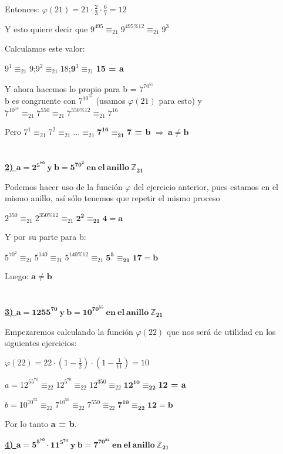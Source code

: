 \documentclass[11pt, a4paper, titlepage]{article}
\providecommand{\ent}{\mathbb{Z}}
\begin{document}
Entonces: $\varphi(21) = 21\cdot\frac{2}{3}\cdot\frac{6}{7} = 12$

Y esto quiere decir que $9^{495} \equiv_{21} 9^{495\%12}\equiv_{21}9^3 $

Calculamos este valor:

$9^1\equiv_{21}9$\quad;\quad$9^2\equiv_{21}18$\quad;\quad$\mathbf9^3\equiv_{21}$\textbf{15 = a}

Y ahora hacemos lo propio para b = $7^{70^{55}}$
\\ b es congruente con $7^{10^{55}}$ (usamos $\varphi(21)$ para esto)
y $7^{10^{55}}\equiv_{21}7^{550}\equiv_{21}7^{550\%12}\equiv_{21}7^{16}$

Pero $7^1\equiv_{21}7^2\equiv_{21}...\equiv_{21}\mathbf7^{\mathbf{16}}\equiv_{\mathbf{21}}$\textbf{7 = b} $\Rightarrow\ \mathbf{a \neq b}$
\\\\\\
\textbf{\underline{2) $\mathbf{a = 2^{5^{70}}\ y\ b = 5^{70^{2}}\ en\ el\ anillo\ \ent_{21} }$}}

Podemos hacer uso de la función $\varphi$ del ejercicio anterior, pues estamos en el mismo anillo, así sólo tenemos que repetir el mismo proceso

$2^{350}\equiv_{21}2^{350\%12}\equiv_{21}\mathbf{2^2\equiv_{21}4 = a}$

Y por su parte para b:

$5^{70^2} \equiv_{21} 5^{140} \equiv_{21} 5^{140\%12} \equiv_{21} \mathbf{5^5 \equiv_{21}17 = b} $

Luego: $\mathbf{a \neq b}$
\\\\\\
\textbf{\underline{3) $\mathbf{a = 12{55^{70}}\ y\ b = 10^{70^{55}}\ en\ el\ anillo\ \ent_{21} }$}}

Empezaremos calculando la función $\varphi(22)$ que nos será de utilidad en los siguientes ejercicios:

$\varphi(22) = 22\cdot(1-\frac{1}{2})\cdot(1-\frac{1}{11}) = 10$

$a = 12^{55^{70}}\equiv_{22}12^{5^{70}}\equiv_{22}12^{350}\equiv_{22}\mathbf{12^{10} \equiv_{22}}$\textbf{12 = a}

$b = 10^{70^{55}}\equiv_{22}7^{10^{50}}\equiv_{22}7^{550}\equiv_{22}\mathbf{7^{10}\equiv_{22} 12 = b}$

Por lo tanto \textbf{a = b}.

\textbf{\underline{4) $\mathbf{a = 5^{5^{70}} \cdot 11^{5^{70}}\ y\ b = 7^{70^{22}}\ en\ el\ anillo\ \ent_{21} }$}}
\end{document}
